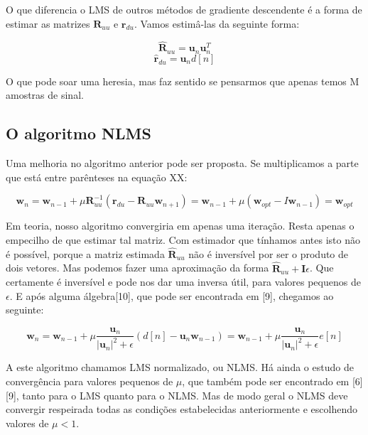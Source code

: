 \documentclass[a4paper, 12pt]{book}
\begin{document}
O que diferencia o LMS de outros métodos de gradiente descendente é a forma de estimar as matrizes $\boldsymbol{R}_{uu}$ e $\boldsymbol{r}_{du}$. Vamos estimâ-las da seguinte forma:

\begin{equation}
\boldsymbol{\hat{R}}_{uu}=\boldsymbol{u}_n \boldsymbol{u}_{n}^T
\end{equation}
\begin{equation}
\boldsymbol{\hat{r}}_{du}=\boldsymbol{u}_n d[n]
\end{equation}

O que pode soar uma heresia, mas faz sentido se pensarmos que apenas temos M amostras de sinal.

\subsection{O algoritmo NLMS}

Uma melhoria no algoritmo anterior pode ser proposta. Se multiplicamos a parte que está entre parênteses na equação XX:

\begin{equation}
\boldsymbol{w}_{n}=\boldsymbol{w}_{n-1} + \mu \boldsymbol{R}_{uu}^{-1}(\boldsymbol{r}_{du}-\boldsymbol{R}_{uu} \boldsymbol{w}_{n+1}) = \boldsymbol{w}_{n-1} + \mu(\boldsymbol{w}_{opt} - I \boldsymbol{w}_{n-1}) = \boldsymbol{w}_{opt}
\end{equation}

Em teoria, nosso algoritmo convergiria em apenas uma iteração. Resta apenas o empecilho de que estimar tal matriz. Com estimador que tínhamos antes isto não é possível, porque a matriz estimada $\boldsymbol{\hat{R}}_{uu}$ não é inversível por ser o produto de dois vetores. Mas podemos fazer uma aproximação da forma $\boldsymbol{\hat{R}}_{uu} + \boldsymbol{I} \epsilon$. Que certamente é inversível e pode nos dar uma inversa útil, para valores pequenos de $\epsilon$. E após alguma álgebra[10], que pode ser encontrada em [9], chegamos ao seguinte:

\begin{equation}
\boldsymbol{w}_{n}=\boldsymbol{w}_{n-1} + \mu \frac{\boldsymbol{u}_{n}}{|\boldsymbol{u}_{n}|^2 + \epsilon }(d[n]-\boldsymbol{u}_{n} \boldsymbol{w}_{n-1}) =\boldsymbol{w}_{n-1} + \mu \frac{\boldsymbol{u}_{n}}{|\boldsymbol{u}_{n}|^2 + \epsilon }e[n]
\end{equation}

A este algoritmo chamamos LMS normalizado, ou NLMS. Há ainda o estudo de convergência para valores pequenos de $\mu$, que também pode ser encontrado em [6][9], tanto para o LMS quanto para o NLMS. Mas de modo geral o NLMS deve convergir respeirada todas as condições estabelecidas anteriormente e escolhendo valores de $\mu<1$.
\end{document}
